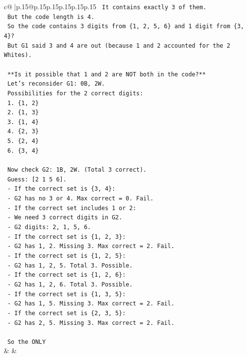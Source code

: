 \documentclass{article}
\begin{document}
{\begin{supertabular}{c@{$\;$}|p{.15\linewidth}@{}p{.15\linewidth}p{.15\linewidth}p{.15\linewidth}p{.15\linewidth}p{.15\linewidth}}
{{{\texttt{    It contains exactly 3 of them.} \\
\texttt{    But the code length is 4.} \\
\texttt{    So the code contains 3 digits from \{1, 2, 5, 6\} and 1 digit from \{3, 4\}?} \\
\texttt{    But G1 said 3 and 4 are out (because 1 and 2 accounted for the 2 Whites).} \\
\\ 
\texttt{    **Is it possible that 1 and 2 are NOT both in the code?**} \\
\texttt{    Let's reconsider G1: 0B, 2W.} \\
\texttt{    Possibilities for the 2 correct digits:} \\
\texttt{    1. \{1, 2\}} \\
\texttt{    2. \{1, 3\}} \\
\texttt{    3. \{1, 4\}} \\
\texttt{    4. \{2, 3\}} \\
\texttt{    5. \{2, 4\}} \\
\texttt{    6. \{3, 4\}} \\
\\ 
\texttt{    Now check G2: 1B, 2W. (Total 3 correct).} \\
\texttt{    Guess: {[}2 1 5 6{]}.} \\
\texttt{    {-} If the correct set is \{3, 4\}:} \\
\texttt{        {-} G2 has no 3 or 4. Max correct = 0. Fail.} \\
\texttt{    {-} If the correct set includes 1 or 2:} \\
\texttt{        {-} We need 3 correct digits in G2.} \\
\texttt{        {-} G2 digits: 2, 1, 5, 6.} \\
\texttt{        {-} If the correct set is \{1, 2, 3\}:} \\
\texttt{            {-} G2 has 1, 2. Missing 3. Max correct = 2. Fail.} \\
\texttt{        {-} If the correct set is \{1, 2, 5\}:} \\
\texttt{            {-} G2 has 1, 2, 5. Total 3. Possible.} \\
\texttt{        {-} If the correct set is \{1, 2, 6\}:} \\
\texttt{            {-} G2 has 1, 2, 6. Total 3. Possible.} \\
\texttt{        {-} If the correct set is \{1, 3, 5\}:} \\
\texttt{            {-} G2 has 1, 5. Missing 3. Max correct = 2. Fail.} \\
\texttt{        {-} If the correct set is \{2, 3, 5\}:} \\
\texttt{            {-} G2 has 2, 5. Missing 3. Max correct = 2. Fail.} \\
\\ 
\texttt{    So the ONLY} \\
            }
        }
    }
    & & \\ \\


\end{supertabular}}
\end{document}

